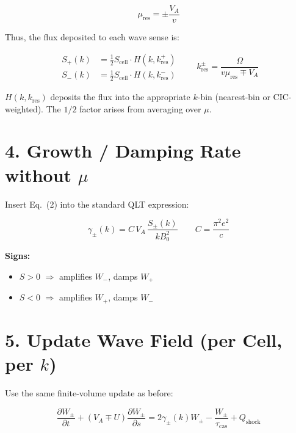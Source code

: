 \begin{equation}
\mu_{\text{res}} = \pm \frac{V_A}{v} \tag{1}
\end{equation}

Thus, the flux deposited to each wave sense is:

\begin{equation}
\boxed{
\begin{aligned}
S_+(k) &= \tfrac{1}{2} S_{\text{cell}} \cdot H(k, k_{\text{res}}^+) \\
S_-(k) &= \tfrac{1}{2} S_{\text{cell}} \cdot H(k, k_{\text{res}}^-)
\end{aligned}
}
\qquad
k_{\text{res}}^\pm = \frac{\Omega}{v \mu_{\text{res}} \mp V_A}
\tag{2}
\end{equation}

$H(k, k_{\text{res}})$ deposits the flux into the appropriate $k$-bin (nearest-bin or CIC-weighted). The $1/2$ factor arises from averaging over $\mu$.

\section*{4. Growth / Damping Rate without $\mu$}

Insert Eq.~(2) into the standard QLT expression:

\begin{equation}
\boxed{
\gamma_\pm(k) = C \, V_A \, \frac{S_\pm(k)}{k B_0^2}
}
\qquad
C = \frac{\pi^2 e^2}{c}
\tag{3}
\end{equation}

\textbf{Signs:}
\begin{itemize}
    \item $S > 0$ $\Rightarrow$ amplifies $W_-$, damps $W_+$
    \item $S < 0$ $\Rightarrow$ amplifies $W_+$, damps $W_-$
\end{itemize}

\section*{5. Update Wave Field (per Cell, per $k$)}

Use the same finite-volume update as before:

\begin{equation}
\frac{\partial W_\pm}{\partial t}
+ (V_A \mp U)\frac{\partial W_\pm}{\partial s}
= 2\gamma_\pm(k) W_\pm
- \frac{W_\pm}{\tau_{\text{cas}}}
+ Q_{\text{shock}}
\tag{4}
\end{equation}


